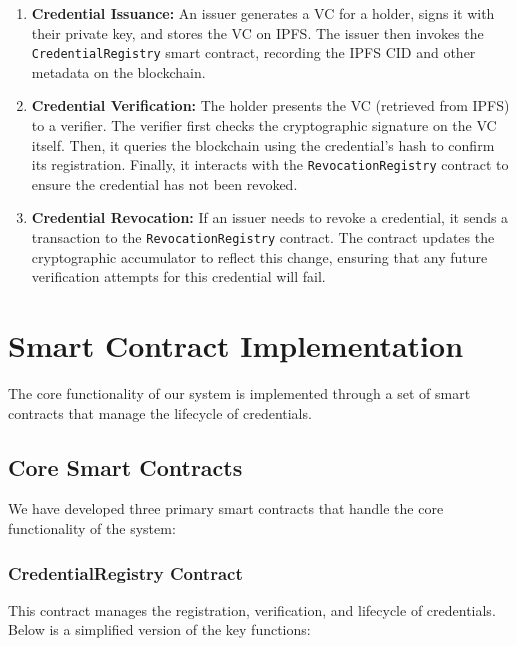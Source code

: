 \documentclass[lettersize,journal]{IEEEtran}
\begin{document}
\begin{enumerate}
    \item \textbf{Credential Issuance:} An issuer generates a VC for a holder, signs it with their private key, and stores the VC on IPFS. The issuer then invokes the \texttt{CredentialRegistry} smart contract, recording the IPFS CID and other metadata on the blockchain.
    \item \textbf{Credential Verification:} The holder presents the VC (retrieved from IPFS) to a verifier. The verifier first checks the cryptographic signature on the VC itself. Then, it queries the blockchain using the credential's hash to confirm its registration. Finally, it interacts with the \texttt{RevocationRegistry} contract to ensure the credential has not been revoked.
    \item \textbf{Credential Revocation:} If an issuer needs to revoke a credential, it sends a transaction to the \texttt{RevocationRegistry} contract. The contract updates the cryptographic accumulator to reflect this change, ensuring that any future verification attempts for this credential will fail.
\end{enumerate}

\section{Smart Contract Implementation}

The core functionality of our system is implemented through a set of smart contracts that manage the lifecycle of credentials.

\subsection{Core Smart Contracts}
We have developed three primary smart contracts that handle the core functionality of the system:

\subsubsection{CredentialRegistry Contract} This contract manages the registration, verification, and lifecycle of credentials. Below is a simplified version of the key functions:
\end{document}
